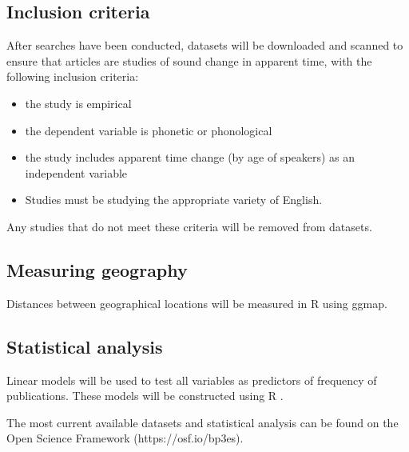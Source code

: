 \documentclass[review]{article}
\begin{document}
\subsection{Inclusion criteria}

After searches have been conducted, datasets will be downloaded and scanned to ensure that articles are studies of sound change in apparent time, with the following inclusion criteria:

\begin{itemize}
<<<<<<< HEAD
	\item the study is empirical
	\item the dependent variable is phonetic or phonological
	\item the study includes apparent time change (by age of speakers) as an independent variable
	\item Studies must be studying the appropriate variety of English.
\end{itemize}



Any studies that do not meet these criteria will be removed from datasets.


\subsection{Measuring geography}

Distances between geographical locations will be measured in R using ggmap.



\subsection{Statistical analysis}
Linear models will be used to test all variables as predictors of frequency of publications. These models will be constructed using R \cite{R2018}.

The most current available datasets and statistical analysis can be found on the Open Science Framework (https://osf.io/bp3es). 




\end{document}
